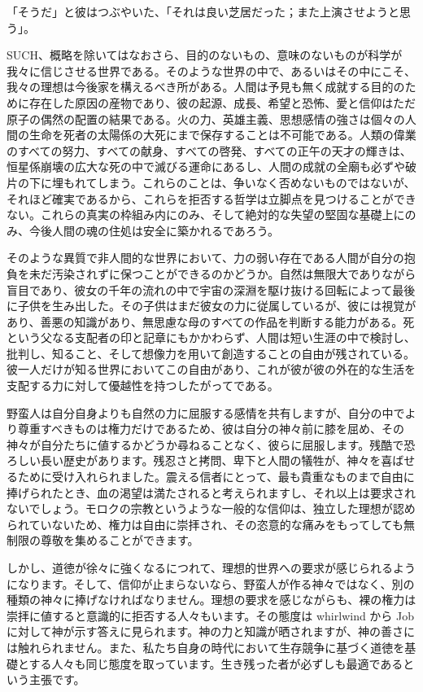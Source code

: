 \documentclass[a4paper,11pt,openany]{ltjsbook}
\begin{document}
「そうだ」と彼はつぶやいた、「それは良い芝居だった；また上演させようと思う」。

SUCH、概略を除いてはなおさら、目的のないもの、意味のないものが科学が我々に信じさせる世界である。そのような世界の中で、あるいはその中にこそ、我々の理想は今後家を構えるべき所がある。人間は予見も無く成就する目的のために存在した原因の産物であり、彼の起源、成長、希望と恐怖、愛と信仰はただ原子の偶然の配置の結果である。火の力、英雄主義、思想感情の強さは個々の人間の生命を死者の太陽係の大死にまで保存することは不可能である。人類の偉業のすべての努力、すべての献身、すべての啓発、すべての正午の天才の輝きは、恒星係崩壊の広大な死の中で滅びる運命にあるし、人間の成就の全廟も必ずや破片の下に埋もれてしまう。これらのことは、争いなく否めないものではないが、それほど確実であるから、これらを拒否する哲学は立脚点を見つけることができない。これらの真実の枠組み内にのみ、そして絶対的な失望の堅固な基礎上にのみ、今後人間の魂の住処は安全に築かれるであろう。

そのような異質で非人間的な世界において、力の弱い存在である人間が自分の抱負を未だ汚染されずに保つことができるのかどうか。自然は無限大でありながら盲目であり、彼女の千年の流れの中で宇宙の深淵を駆け抜ける回転によって最後に子供を生み出した。その子供はまだ彼女の力に従属しているが、彼には視覚があり、善悪の知識があり、無思慮な母のすべての作品を判断する能力がある。死という父なる支配者の印と記章にもかかわらず、人間は短い生涯の中で検討し、批判し、知ること、そして想像力を用いて創造することの自由が残されている。彼一人だけが知る世界においてこの自由があり、これが彼が彼の外在的な生活を支配する力に対して優越性を持つしたがってである。

野蛮人は自分自身よりも自然の力に屈服する感情を共有しますが、自分の中でより尊重すべきものは権力だけであるため、彼は自分の神々前に膝を屈め、その神々が自分たちに値するかどうか尋ねることなく、彼らに屈服します。残酷で恐ろしい長い歴史があります。残忍さと拷問、卑下と人間の犠牲が、神々を喜ばせるために受け入れられました。震える信者にとって、最も貴重なものまで自由に捧げられたとき、血の渇望は満たされると考えられますし、それ以上は要求されないでしょう。モロクの宗教というような一般的な信仰は、独立した理想が認められていないため、権力は自由に崇拝され、その恣意的な痛みをもってしても無制限の尊敬を集めることができます。

しかし、道徳が徐々に強くなるにつれて、理想的世界への要求が感じられるようになります。そして、信仰が止まらないなら、野蛮人が作る神々ではなく、別の種類の神々に捧げなければなりません。理想の要求を感じながらも、裸の権力は崇拝に値すると意識的に拒否する人々もいます。その態度は whirlwind から Job に対して神が示す答えに見られます。神の力と知識が晒されますが、神の善さには触れられません。また、私たち自身の時代において生存競争に基づく道徳を基礎とする人々も同じ態度を取っています。生き残った者が必ずしも最適であるという主張です。
\end{document}
